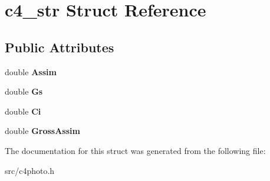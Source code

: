 \hypertarget{structc4__str}{\section{c4\-\_\-str Struct Reference}
\label{structc4__str}
}
\subsection*{Public Attributes}
\begin{DoxyCompactItemize}
\item 
\hypertarget{structc4__str_ade490c8a63b9554b0ee7d88ee7f8153b}{double {\bfseries Assim}}\label{structc4__str_ade490c8a63b9554b0ee7d88ee7f8153b}

\item 
\hypertarget{structc4__str_a29de44c5705baf89ff902918ed0eebee}{double {\bfseries Gs}}\label{structc4__str_a29de44c5705baf89ff902918ed0eebee}

\item 
\hypertarget{structc4__str_addf79252395eafb94542bb05ce71eb09}{double {\bfseries Ci}}\label{structc4__str_addf79252395eafb94542bb05ce71eb09}

\item 
\hypertarget{structc4__str_a928a57132388ea027d82a5d841d29ea3}{double {\bfseries Gross\-Assim}}\label{structc4__str_a928a57132388ea027d82a5d841d29ea3}

\end{DoxyCompactItemize}


The documentation for this struct was generated from the following file\-:\begin{DoxyCompactItemize}
\item 
src/c4photo.\-h\end{DoxyCompactItemize}
